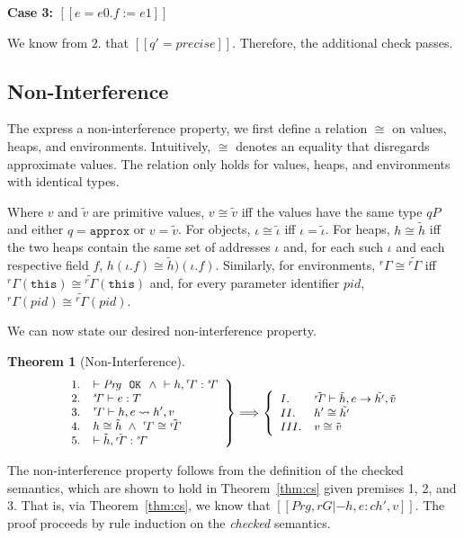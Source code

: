 \documentclass[final,10pt,twoside]{article}
\def\qed{\unskip\kern 10pt{\unitlength1pt\linethickness{.4pt}\framebox(6,6){}}}
\newtheorem{theorem}[definition]{Theorem}
\newcommand\proofcase[1]{\vspace{4mm plus 1mm minus 1mm}\noindent\textbf{#1}}
\newcommand{\sG}{\ensuremath{\mathit{^{s}\!\Gamma}}}
\newcommand{\rG}{\ensuremath{\mathit{^{r}\!\Gamma}}}
\begin{document}
\proofcase{Case 3: $[[e = e0 . f := e1]]$}

We know from $2.$ that $[[q'=precise]]$.
Therefore, the additional check passes.
\qed


\subsection{Non-Interference}

The express a non-interference property, we first define a relation $\cong$ on
values, heaps, and environments. Intuitively, 
$\cong$ denotes an equality that disregards approximate
values. The relation only holds for values, heaps, and environments with
identical types.

Where $v$ and $\tilde{v}$ are primitive values, $v \cong \tilde{v}$ iff the
values have the same type $qP$ and either $q = \mathtt{approx}$ or $v =
\tilde{v}$. For objects, $\iota \cong \tilde{\iota}$ iff $\iota =
\tilde{\iota}$.
For heaps, $h \cong \tilde{h}$ iff the two heaps contain the same set of
addresses $\iota$ and, for each such $\iota$ and each respective field
$f$, $h(\iota.f) \cong \tilde{h})(\iota.f)$. Similarly, for environments,
$\rG \cong \tilde{\rG}$ iff
$\rG(\texttt{this}) \cong \tilde{\rG}(\texttt{this})$ and, for every parameter
identifier $pid$, $\rG(pid) \cong \tilde{\rG}(pid)$.

We can now state our desired non-interference property.

\begin{theorem}[Non-Interference]
\label{thm:ni}
\[
\small
\left.
\begin{array}{ll}
1. & |- \mathit{Prg}\ \ \mathtt{OK} \ \ \wedge\  |- h, \rG : \sG\\
2. & \sG |- e : T\\
3. & \rG |- h, e \leadsto h', v\\
4. & h \cong \tilde{h}  \ \wedge\  \rG \cong \tilde{\rG}\\
5. & |- \tilde{h}, \tilde{\rG} : \sG\\
\end{array}
\right\}
==>
\left\{
\begin{array}{ll}
I. & \tilde{\rG} |- \tilde{h}, e -> \tilde{h'}, \tilde{v}\\
II. & h' \cong \tilde{h'}\\
III. & v \cong \tilde{v}
\end{array}
\right.
\]
\end{theorem}

The non-interference property follows from the definition of the checked
semantics, which are shown to hold in Theorem~\ref{thm:cs} given premises 1, 2,
and 3. That
is, via Theorem~\ref{thm:cs}, we know that 
$[[Prg, rG |- h, e :c h', v]]$. The proof proceeds by rule induction on the
\emph{checked} semantics.
\end{document}
